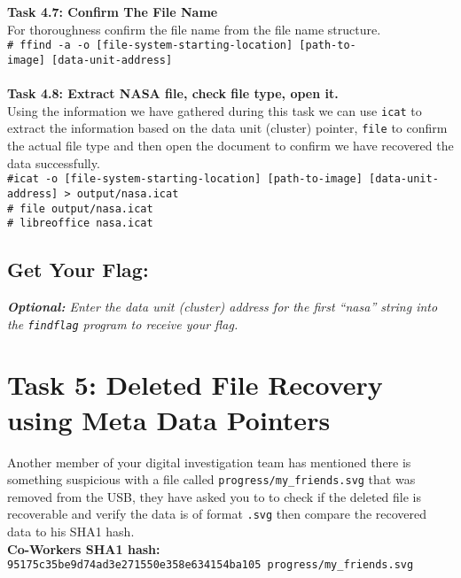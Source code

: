 \documentclass[a4paper,11pt]{article}
\begin{document}
{\noindent
\textbf{Task 4.7: Confirm The File Name}\\
For thoroughness confirm the file name from the file name structure.\\
\texttt{{\#} ffind -a -o [file-system-starting-location] [path-to-\\image] [data-unit-address] } \\
\\
}
{\noindent
\textbf{Task 4.8: Extract NASA file, check file type, open it.}\\
Using the information we have gathered during this task we can use \texttt{icat} to extract the information based on the data unit (cluster) pointer, \texttt{file} to confirm the actual file type and then open the document to confirm we have recovered the data successfully.\\
\texttt{{\#}icat -o [file-system-starting-location]  [path-to-image] [data-unit-address] > output/nasa.icat }\\
\noindent
\verb|# file output/nasa.icat|\\
\noindent
\verb|# libreoffice nasa.icat|
}
\subsection*{Get Your Flag:}
\noindent
\textit{\textbf{Optional:} Enter the \textit{data unit} (cluster) address for the first ``nasa'' string into the \texttt{findflag} program to receive your flag.}

\section{Task 5: Deleted File Recovery using Meta Data Pointers}
Another member of your digital investigation team has mentioned there is something suspicious with a file called \texttt{progress/my\_friends.svg} that was removed from the USB, they have asked you to to check if the deleted file is recoverable and verify the data is of format \texttt{.svg} then compare the recovered data to his SHA1 hash.\\

{\noindent
\textbf{Co-Workers SHA1 hash:}\\
\texttt{95175c35be9d74ad3e271550e358e634154ba105  progress/my\_friends.svg}
}
\end{document}

